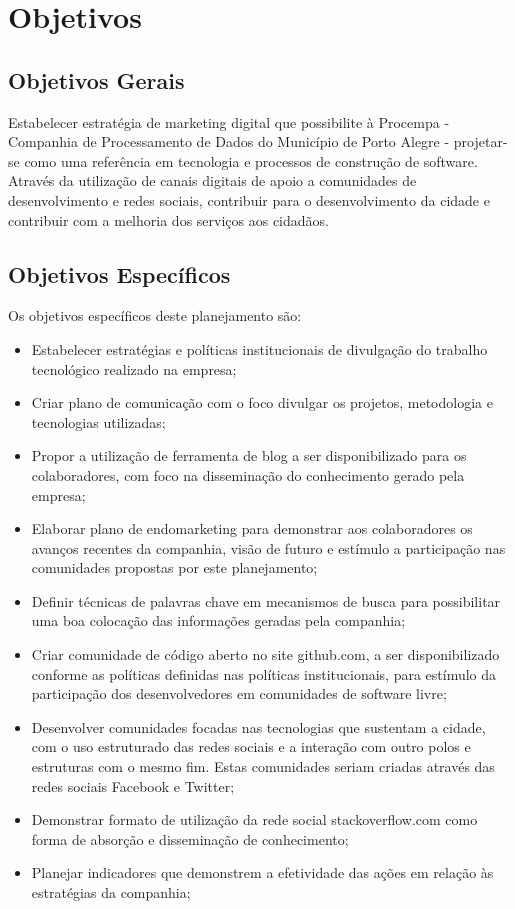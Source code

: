 \chapter{Objetivos}
\section{Objetivos Gerais}
Estabelecer estratégia de marketing digital que possibilite à Procempa - Companhia de Processamento de Dados do Município de Porto Alegre - projetar-se como uma referência em tecnologia e processos de construção de software. Através da utilização de canais digitais de apoio a comunidades de desenvolvimento e redes sociais, contribuir para o desenvolvimento da cidade e contribuir com a melhoria dos serviços aos cidadãos.

\section{Objetivos Específicos}
Os objetivos específicos deste planejamento são:
\begin{itemize}
\item Estabelecer estratégias e políticas institucionais de divulgação do trabalho tecnológico realizado na empresa;
\item Criar plano de comunicação com o foco divulgar os projetos, metodologia e tecnologias utilizadas;
\item Propor a utilização de ferramenta de blog a ser disponibilizado para os colaboradores, com foco na disseminação do conhecimento gerado pela empresa;
\item Elaborar plano de endomarketing para demonstrar aos colaboradores os avanços recentes da companhia, visão de futuro e estímulo a participação nas comunidades propostas por este planejamento;
\item Definir técnicas de palavras chave em mecanismos de busca para possibilitar uma boa colocação das informações geradas pela companhia;
\item Criar comunidade de código aberto no site github.com, a ser disponibilizado conforme as políticas definidas nas políticas institucionais, para estímulo da participação dos desenvolvedores em comunidades de software livre;
\item Desenvolver comunidades focadas nas tecnologias que sustentam a cidade, com o uso estruturado das redes sociais e a interação com outro polos e estruturas com o mesmo fim. Estas comunidades seriam criadas através das redes sociais Facebook e Twitter;
\item Demonstrar formato de utilização da rede social stackoverflow.com como forma de absorção e disseminação de conhecimento;
\item Planejar indicadores que demonstrem a efetividade das ações em relação às estratégias da companhia;
\end{itemize}
